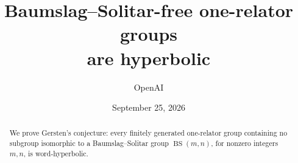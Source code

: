 \documentclass[11pt]{article}
\title{Baumslag--Solitar-free one-relator groups\\are hyperbolic}
\author{OpenAI}
\date{September 25, 2026}
\theoremstyle{definition}
\numberwithin{equation}{section}
\begin{document}
\maketitle
\begin{abstract}
We prove Gersten's conjecture: every finitely generated one-relator group
containing no subgroup isomorphic to a Baumslag--Solitar group
$\operatorname{BS}(m,n)$, for nonzero integers $m,n$, is word-hyperbolic.
\end{abstract}
\tableofcontents











\end{document}
